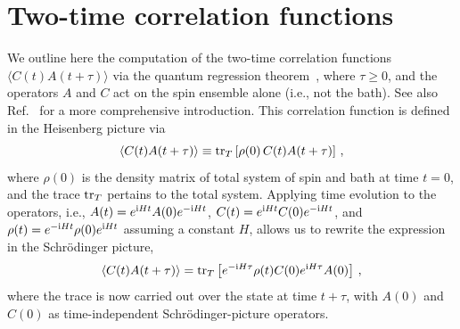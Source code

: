 \documentclass[aps,prd,10pt,twocolumn,superscriptaddress,floatfix,nofootinbib,amsmath,amssymb,altaffilletter,preprintnumbers]{revtex4-1}
\begin{document}


\section{Two-time correlation functions} \label{sec:twotime}

We outline here the computation of the two-time correlation functions $\langle C(t) A(t+\tau) \rangle$ via the quantum regression theorem~\cite{QRT}, where $\tau \geq0$, and the operators $A$ and $C$ act on the spin ensemble alone (i.e., not the bath).  See also Ref.~\cite{carmichael1} for a more comprehensive introduction.
This correlation function is defined in the Heisenberg picture via 
\begin{equation}
\langle C(t) A(t+\tau) \rangle \equiv {\rm tr}_T \left[\rho(0) \, C(t) A(t +\tau)\right]\,,
\end{equation}
where $\rho(0)$ is the density matrix of total system of spin and bath at time $t=0$, and the trace ${\rm tr}_T$ pertains to the total system. Applying time evolution to the operators, i.e., $A(t) = e^{{\rm i}Ht} A(0) e^{-{\rm i} Ht}$,  $C(t) = e^{{\rm i}Ht} C(0) e^{-{\rm i} Ht}$, and $\rho(t) = e^{-{\rm i}Ht} \rho(0) e^{{\rm i} Ht}$ assuming a constant $H$, allows us to rewrite the expression in the Schr\"{o}dinger picture, 
\begin{equation}
\langle C(t) A(t+\tau) \rangle = {\rm tr}_T\left[ e^{-{\rm i} H \tau} \rho(t) C(0) e^{{\rm i} H\tau} A(0)\right]\, ,
\end{equation}
where the trace is now carried out over the state at time $t+\tau$, with $A(0)$ and $C(0)$ as time-independent Schr\"{o}dinger-picture operators.
\end{document}

